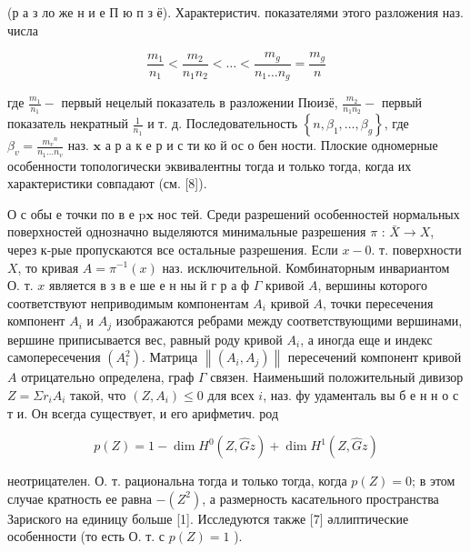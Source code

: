 \documentclass[10pt]{article}
\begin{document}
(р а з ло же н и е П ю п з ё). Характеристич. показателями этого разложения наз. числа



\[

\frac{m_{1}}{n_{1}}<\frac{m_{2}}{n_{1} n_{2}}<\ldots<\frac{m_{g}}{n_{1} \ldots n_{g}}=\frac{m_{g}}{n}

\]



где $\frac{m_{1}}{n_{1}}-$ первый нецелый показатель в разложении Пюизё, $\frac{m_{2}}{n_{1} n_{2}}-$ первый показатель некратный $\frac{1}{n_{1}}$ и т. д. Последовательность $\left\{n, \beta_{1}, \ldots, \beta_{g}\right\}$, где $\beta_{v}=\frac{m_{v}{ }^{n}}{n_{1} \ldots n_{v}}$ наз. $\mathbf{x}$ а р а к е р и с ти ко й ос о бен ности. Плоские одномерные особенности топологически эквивалентны тогда и только тогда, когда их характеристики совпадают (см. [8]).



О с обы е точки по в е $\mathrm{p} \mathbf{x}$ нос тей. Среди разрешений особенностей нормальных поверхностей однозначно выделяются минимальные разрешения $\pi$ : $\bar{X} \rightarrow X$, через к-рые пропускаются все остальные разрешения. Если $x-0$. т. поверхности $X$, то кривая $A=\pi^{-1}(x)$ наз. исключительной. Комбинаторным инвариантом О. т. $x$ является в з в е ше е н ны й г р а ф $\Gamma$ кривой $A$, вершины которого соответствуют неприводимым компонентам $A_{i}$ кривой $A$, точки пересечения компонент $A_{i}$ и $A_{j}$ изображаются ребрами между соответствующими вершинами, вершине приписывается вес, равный роду кривой $A_{i}$, а иногда еще и индекс самопересечения $\left(A_{i}^{2}\right)$. Матрица $\left\|\left(A_{i}, A_{j}\right)\right\|$ пересечений компонент кривой $A$ отрицательно определена, граф $\Gamma$ связен. Наименьший положительный дивизор $Z=\Sigma r_{i} A_{i}$ такой, что $\left(Z, A_{i}\right) \leqslant 0$ для всех $i$, наз. фу удаменталь вы б е н н о с т и. Он всегда существует, и его арифметич. род



\[

p(Z)=1-\operatorname{dim} H^{0}(Z, \widehat{G} z)+\operatorname{dim} H^{1}(Z, \widehat{G} z)

\]



неотрицателен. О. т. рациональна тогда и только тогда, когда $p(Z)=0$; в этом случае кратность ее равна $-\left(Z^{2}\right)$, а размерность касательного пространства Зариского на единицу больше [1]. Исследуются также [7] әллиптические особенности (то есть О. т. с $p(Z)=1$ ).
\end{document}
